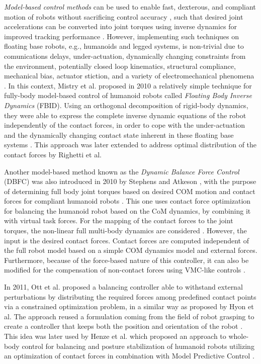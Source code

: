 	\emph{Model-based control methods} can be used to enable fast, dexterous, and compliant motion of
	robots without sacrificing control accuracy \cite{Mistry_ICRA2010}, such that desired joint
	accelerations can be converted into joint torques using inverse dynamics for improved tracking
	performance \cite{Stephens_IROS2010}.
	However, implementing such techniques on floating base robots, e.g., humanoids and legged systems,
	is non-trivial due to comunications delays, under-actuation, dynamically changing constraints from
	the environment, potentially closed loop kinematics, structural compliance, mechanical bias, actuator
	stiction, and a variety of electromechanical phenomena \cite{Mistry_ICRA2010} \cite{Hopkins_ICRA2015}.
	In this context, Mistry et al. \cite{Mistry_ICRA2010} proposed in 2010 a relatively simple technique
	for fully-body model-based control of humanoid robots called \emph{Floating Body Inverse Dynamics}
	(FBID).
	Using an orthogonal decomposition of rigid-body dynamics, they were able to express the complete
	inverse dynamic equations of the robot independently of the contact forces, in order to cope with the
	under-actuation and the dynamically changing contact state inherent in these floating base systems
	\cite{Mistry_ICRA2010}.
	This approach was later extended to address optimal distribution of the contact forces by
	Righetti et al. \cite{Righetti_CLAWAR2010}
	
	Another model-based method known as the \emph{Dynamic Balance Force Control} (DBFC) was also introduced
	in 2010 by Stephens and Atkeson \cite{Stephens_IROS2010}, with the purpose of determining full body
	joint torques based on desired COM motion and contact forces for compliant humanoid robots
	\cite{Stephens_IROS2010}.
	This one uses contact force optimization for balancing the humanoid robot based on the CoM dynamics,
	by combining it with virtual task forces.
	For the mapping of the contact forces to the joint torques, the non-linear full multi-body dynamics are
	considered \cite{Ott_Humanoids2011}.
	However, the input is the desired contact forces.
	Contact forces are computed independent of the full robot model based on a simple COM dynamics model and
	external forces.
	Furthermore, because of the force-based nature of this controller, it can also be modified for the
	compensation of non-contact forces using VMC-like controls \cite{Stephens_IROS2010}.
	
	In 2011, Ott et al. \cite{Ott_Humanoids2011} proposed a balancing controller able to withstand external
	perturbations by distributing the required forces among predefined contact points via a	constrained
	optimization problem, in a similar way as proposed by Hyon et al. \cite{Hyon_TransRobotics2007}
	The approach reused a formulation coming from the field of robot grasping to create a controller that
	keeps both the position and orientation of the robot \cite{Ott_Humanoids2011}.
	This idea was later used by Henze et al. \cite{Henze_IROS2014} which proposed an approach to whole-body
	control for balancing and posture	stabilization of humanoid robots utilizing an optimization of contact
	forces in combination with Model Predictive Control \cite{Henze_IROS2014}.
	
